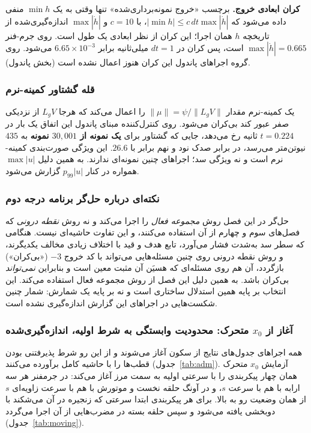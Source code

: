 \documentclass[10pt,twocolumn]{article}
\newcommand{\en}[1]{\lr{#1}}
\newcommand{\nd}{\lr{\textendash}}
\begin{document}
\textbf{کران ابعادی خروج.} برچسب «خروج نمونه‌برداری‌شده» تنها وقتی به یک $\min h$ منفی داده
می‌شود که $|\min h|\le c\,dt\max|\dot h|$، با $c=10$ و $\max|\dot h|$ اندازه‌گیری‌شده از
تاریخچه $h$ همان اجرا؛ این کران از نظر ابعادی یک طول است. روی جرم-فنر
$\max|\dot h|=0.665$ است، پس کران در $dt=1$ میلی‌ثانیه برابر $6.65\times10^{-3}$ می‌شود.
روی گروه اجراهای پاندول این کران هنوز اعمال نشده است (بخش پاندول).

\subsubsection{قله گشتاور کمینه-نرم}
یک \en{CLF-QP} کمینه-نرم مقدار $\|\mu\| = \psi/\|L_g V\|$ را اعمال می‌کند که
هرجا $L_g V$ از نزدیکی صفر عبور کند بی‌کران می‌شود. روی کنترل‌کننده مبنای
پاندول این اتفاق یک بار در $t=0.224$ ثانیه رخ می‌دهد، جایی که گشتاور برای
\textbf{یک نمونه از $30{,}001$ نمونه} به $435$ نیوتن‌متر می‌رسد، در برابر صدک
نود و نهم برابر با $26.6$. این ویژگی صورت‌بندی کمینه-نرم است و نه ویژگی سد؛
اجراهای \en{ECBF} چنین نمونه‌ای ندارند. به همین دلیل $\max|u|$ همواره در کنار
$p_{99}|u|$ گزارش می‌شود.

\subsubsection{نکته‌ای درباره حل‌گر برنامه درجه دوم}
حل‌گر در این فصل روش \emph{مجموعه فعال} را اجرا می‌کند و نه روش \emph{نقطه
درونی} که فصل‌های سوم و چهارم از آن استفاده می‌کنند، و این تفاوت حاشیه‌ای نیست.
هنگامی که سطر سد به‌شدت فشار می‌آورد، تابع هدف \en{CLF} و قید \en{ECBF} با
اختلاف زیادی مخالف یکدیگرند، و روش نقطه درونی روی چنین مسئله‌هایی می‌تواند با کد
خروج $-3$ («بی‌کران») بازگردد، آن هم روی مسئله‌ای که هسیَن آن مثبت معین است و
بنابراین \emph{نمی‌تواند} بی‌کران باشد. به همین دلیل این فصل از روش مجموعه فعال
استفاده می‌کند. این انتخاب بر پایه همین استدلال ساختاری است و نه بر پایه یک شمارش: شمار
چنین شکست‌هایی در اجراهای این گزارش اندازه‌گیری نشده است.

\subsubsection{آغاز از $x_0$ متحرک: محدودیت وابستگی به شرط اولیه، اندازه‌گیری‌شده}
\label{sec:moving}
همه اجراهای جدول‌های نتایج از سکون آغاز می‌شوند و از این رو شرط پذیرفتنی بودن قطب‌ها
را با حاشیه کامل برآورده می‌کنند (جدول~\ref{tab:adm}). آزمایش $x_0$ متحرک همان
چهار پیکربندی را با سرعتی اولیه به سمت مرز آغاز می‌کند: در جرم\nd{}فنر هر سه ارابه
با هم با سرعت $s$، و در آونگ حلقه نخست و موتورش با هم با سرعت زاویه‌ای $s$ از همان
وضعیت رو به بالا. برای هر پیکربندی ابتدا سرعتی که زنجیره در آن می‌شکند با دوبخشی
یافته می‌شود و سپس حلقه بسته در مضرب‌هایی از آن اجرا می‌گردد
(جدول~\ref{tab:moving}).
\end{document}
